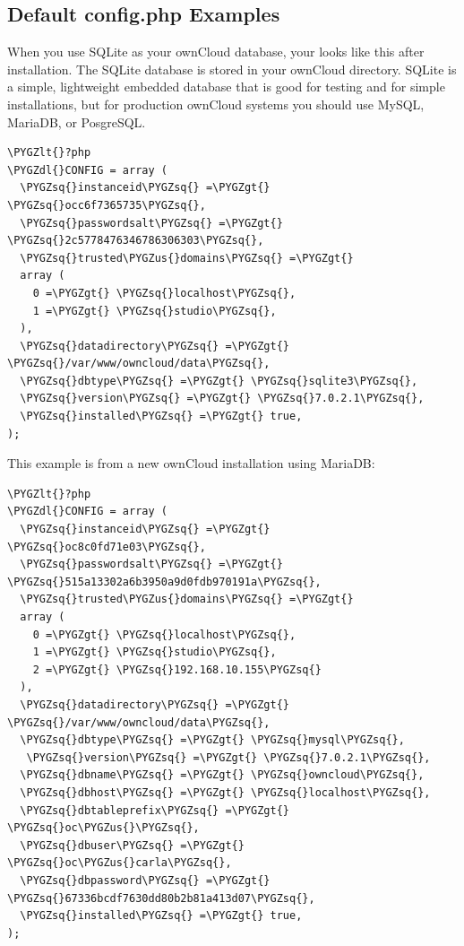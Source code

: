 \documentclass[letterpaper,10pt,english]{sphinxmanual}
\def\PYGZus{\char`\_}
\def\PYGZlt{\char`\<}
\def\PYGZgt{\char`\>}
\def\PYGZdl{\char`\$}
\def\PYGZsq{\char`\'}
\renewcommand\PYGZsq{\textquotesingle}
\begin{document}
\subsection{Default config.php Examples}
\label{configuration_server/config_sample_php_parameters:default-config-php-examples}
When you use SQLite as your ownCloud database, your  looks like
this after installation. The SQLite database is stored in your ownCloud
 directory. SQLite is a simple, lightweight embedded database that
is good for testing and for simple installations, but for production ownCloud
systems you should use MySQL, MariaDB, or PosgreSQL.

\begin{Verbatim}[commandchars=\\\{\}]
\PYGZlt{}?php
\PYGZdl{}CONFIG = array (
  \PYGZsq{}instanceid\PYGZsq{} =\PYGZgt{} \PYGZsq{}occ6f7365735\PYGZsq{},
  \PYGZsq{}passwordsalt\PYGZsq{} =\PYGZgt{} \PYGZsq{}2c5778476346786306303\PYGZsq{},
  \PYGZsq{}trusted\PYGZus{}domains\PYGZsq{} =\PYGZgt{}
  array (
    0 =\PYGZgt{} \PYGZsq{}localhost\PYGZsq{},
    1 =\PYGZgt{} \PYGZsq{}studio\PYGZsq{},
  ),
  \PYGZsq{}datadirectory\PYGZsq{} =\PYGZgt{} \PYGZsq{}/var/www/owncloud/data\PYGZsq{},
  \PYGZsq{}dbtype\PYGZsq{} =\PYGZgt{} \PYGZsq{}sqlite3\PYGZsq{},
  \PYGZsq{}version\PYGZsq{} =\PYGZgt{} \PYGZsq{}7.0.2.1\PYGZsq{},
  \PYGZsq{}installed\PYGZsq{} =\PYGZgt{} true,
);
\end{Verbatim}

This example is from a new ownCloud installation using MariaDB:

\begin{Verbatim}[commandchars=\\\{\}]
\PYGZlt{}?php
\PYGZdl{}CONFIG = array (
  \PYGZsq{}instanceid\PYGZsq{} =\PYGZgt{} \PYGZsq{}oc8c0fd71e03\PYGZsq{},
  \PYGZsq{}passwordsalt\PYGZsq{} =\PYGZgt{} \PYGZsq{}515a13302a6b3950a9d0fdb970191a\PYGZsq{},
  \PYGZsq{}trusted\PYGZus{}domains\PYGZsq{} =\PYGZgt{}
  array (
    0 =\PYGZgt{} \PYGZsq{}localhost\PYGZsq{},
    1 =\PYGZgt{} \PYGZsq{}studio\PYGZsq{},
    2 =\PYGZgt{} \PYGZsq{}192.168.10.155\PYGZsq{}
  ),
  \PYGZsq{}datadirectory\PYGZsq{} =\PYGZgt{} \PYGZsq{}/var/www/owncloud/data\PYGZsq{},
  \PYGZsq{}dbtype\PYGZsq{} =\PYGZgt{} \PYGZsq{}mysql\PYGZsq{},
   \PYGZsq{}version\PYGZsq{} =\PYGZgt{} \PYGZsq{}7.0.2.1\PYGZsq{},
  \PYGZsq{}dbname\PYGZsq{} =\PYGZgt{} \PYGZsq{}owncloud\PYGZsq{},
  \PYGZsq{}dbhost\PYGZsq{} =\PYGZgt{} \PYGZsq{}localhost\PYGZsq{},
  \PYGZsq{}dbtableprefix\PYGZsq{} =\PYGZgt{} \PYGZsq{}oc\PYGZus{}\PYGZsq{},
  \PYGZsq{}dbuser\PYGZsq{} =\PYGZgt{} \PYGZsq{}oc\PYGZus{}carla\PYGZsq{},
  \PYGZsq{}dbpassword\PYGZsq{} =\PYGZgt{} \PYGZsq{}67336bcdf7630dd80b2b81a413d07\PYGZsq{},
  \PYGZsq{}installed\PYGZsq{} =\PYGZgt{} true,
);
\end{Verbatim}
\end{document}
